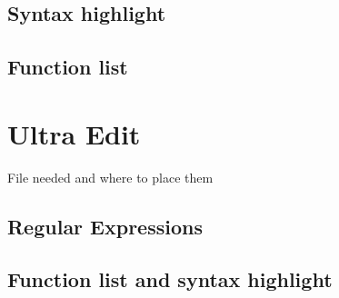 \subsection{Syntax highlight}

\subsection{Function list}

\section{Ultra Edit}
File needed and where to place them

\subsection{Regular Expressions}

\subsection{Function list and syntax highlight}
